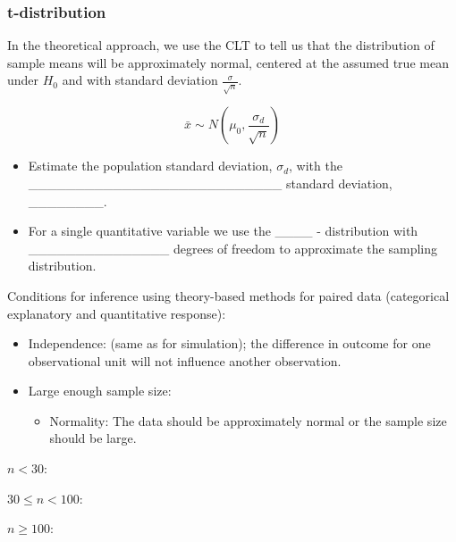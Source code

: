 \documentclass[
]{report}
\providecommand{\tightlist}{%
  \setlength{\itemsep}{0pt}\setlength{\parskip}{0pt}}
\newcommand{\rgi}{\hspace{24pt}}  %
\begin{document}
\subsubsection*{t-distribution}\label{t-distribution}

In the theoretical approach, we use the CLT to tell us that the distribution of sample means will be approximately normal, centered at the assumed true mean under \(H_0\) and with standard deviation \(\frac{\sigma}{\sqrt{n}}\).

\[\bar{x} \sim N(\mu_0, \frac{\sigma_d}{\sqrt{n}})\]

\begin{itemize}
\item
  Estimate the population standard deviation, \(\sigma_d\), with the
  \_\_\_\_\_\_\_\_\_\_\_\_\_\_\_\_\_\_\_\_\_\_\_\_\_\_\_ standard deviation, \_\_\_\_\_\_\_\_.
\item
  For a single quantitative variable we use the \_\_\_\_ - distribution
  with \_\_\_\_\_\_\_\_\_\_\_\_\_\_\_
  degrees of freedom to approximate the sampling distribution.
\end{itemize}


Conditions for inference using theory-based methods for paired data (categorical explanatory and quantitative response):

\begin{itemize}
\item
  Independence: (same as for simulation); the difference in outcome for one observational unit will not influence another observation.
\item
  Large enough sample size:

  \begin{itemize}
  \tightlist
  \item
    Normality: The data should be approximately normal or the sample size should be large.
  \end{itemize}
\end{itemize}

\rgi \rgi \(n < 30\):

\vspace{0.2in}

\rgi \rgi \(30 \leq n < 100\):

\vspace{0.2in}

\rgi \rgi \(n \geq 100\):

\vspace{0.2in}
\end{document}
